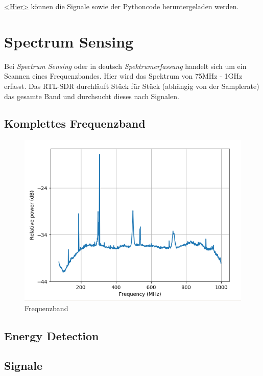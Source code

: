 \documentclass[12pt,a4paper]{article}
\begin{document}
\href{https://mega.nz/file/WlpFUDCI#UwWxYXxkRgZ9H_AYNt0trYvE5ey_xcw59lDZif9uqtI}
{<Hier>} können die Signale sowie der Pythoncode heruntergeladen werden.


\newpage
\section{Spectrum Sensing}
Bei \textit{Spectrum Sensing} oder in deutsch \textit{Spektrumerfassung} handelt sich um ein Scannen eines Frequenzbandes. Hier wird das Spektrum von 75MHz - 1GHz erfasst. Das RTL-SDR durchläuft Stück für Stück (abhängig von der Samplerate) das gesamte Band und durchsucht dieses nach Signalen.

 
\subsection*{Komplettes Frequenzband}

\begin{figure}[hbt!]
	\centering
		\includegraphics[width=1\textwidth ]
		{Bilder/A3_full_frequency_band.png}
		\caption{Frequenzband}
\end{figure}



\subsection*{Energy Detection}

\subsection*{Signale}
\end{document}
